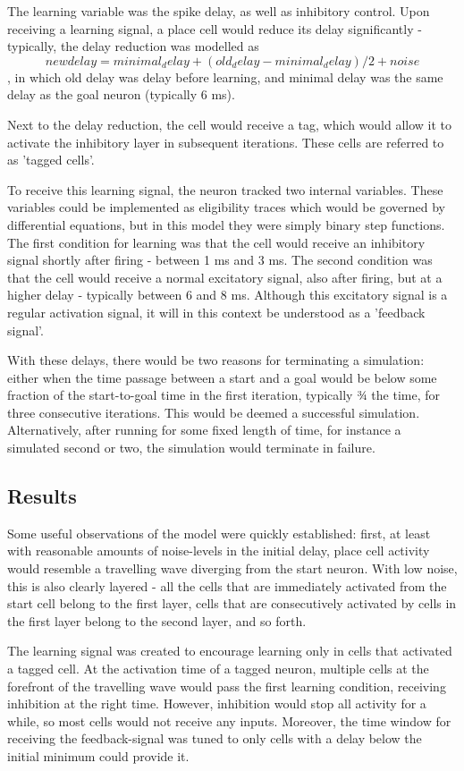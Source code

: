 \documentclass{article}
\begin{document}
The learning variable was the spike delay, as well as inhibitory control. Upon receiving a learning signal, a place cell would reduce its delay significantly - typically, the delay reduction was modelled as \[new delay = minimal_delay + (old_delay-minimal_delay)/2 + noise\], in which old delay was delay before learning, and minimal delay was the same delay as the goal neuron (typically 6 ms).

Next to the delay reduction, the cell would receive a tag, which would allow it to activate the inhibitory layer in subsequent iterations. These cells are referred to as 'tagged cells'.

To receive this learning signal, the neuron tracked two internal variables. These variables could be implemented as eligibility traces which would be governed by differential equations, but in this model they were simply binary step functions. The first condition for learning was that the cell would receive an inhibitory signal shortly after firing - between 1 ms and 3 ms. The second condition was that the cell would receive a normal excitatory signal, also after firing, but at a higher delay - typically between 6 and 8 ms. Although this excitatory signal is a regular activation signal, it will in this context be understood as a 'feedback signal'.

With these delays, there would be two reasons for terminating a simulation: either when the time passage between a start and a goal would be below some fraction of the start-to-goal time in the first iteration, typically ¾ the time, for three consecutive iterations. This would be deemed a successful simulation. Alternatively, after running for some fixed length of time, for instance a simulated second or two, the simulation would terminate in failure.

\subsection{Results}
Some useful observations of the model were quickly established: first, at least with reasonable amounts of noise-levels in the initial delay, place cell activity would resemble a travelling wave diverging from the start neuron. With low noise, this is also clearly layered - all the cells that are immediately activated from the start cell belong to the first layer, cells that are consecutively activated by cells in the first layer belong to the second layer, and so forth.

The learning signal was created to encourage learning only in cells that activated a tagged cell. At the activation time of a tagged neuron, multiple cells at the forefront of the travelling wave would pass the first learning condition, receiving inhibition at the right time. However, inhibition would stop all activity for a while, so most cells would not receive any inputs. Moreover, the time window for receiving the feedback-signal was tuned to only cells with a delay below the initial minimum could provide it.
\end{document}
